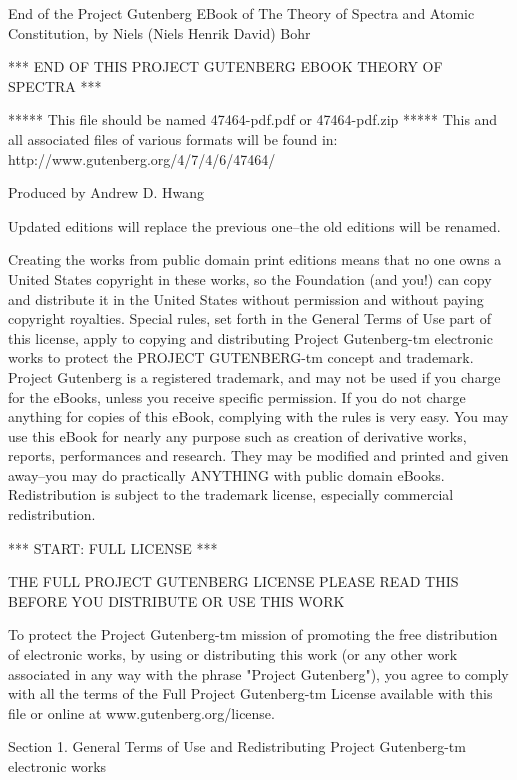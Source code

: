 \PGLicense
\begin{PGtext}
End of the Project Gutenberg EBook of The Theory of Spectra and Atomic
Constitution, by Niels (Niels Henrik David) Bohr

*** END OF THIS PROJECT GUTENBERG EBOOK THEORY OF SPECTRA ***

***** This file should be named 47464-pdf.pdf or 47464-pdf.zip *****
This and all associated files of various formats will be found in:
        http://www.gutenberg.org/4/7/4/6/47464/

Produced by Andrew D. Hwang

Updated editions will replace the previous one--the old editions
will be renamed.

Creating the works from public domain print editions means that no
one owns a United States copyright in these works, so the Foundation
(and you!) can copy and distribute it in the United States without
permission and without paying copyright royalties.  Special rules,
set forth in the General Terms of Use part of this license, apply to
copying and distributing Project Gutenberg-tm electronic works to
protect the PROJECT GUTENBERG-tm concept and trademark.  Project
Gutenberg is a registered trademark, and may not be used if you
charge for the eBooks, unless you receive specific permission.  If you
do not charge anything for copies of this eBook, complying with the
rules is very easy.  You may use this eBook for nearly any purpose
such as creation of derivative works, reports, performances and
research.  They may be modified and printed and given away--you may do
practically ANYTHING with public domain eBooks.  Redistribution is
subject to the trademark license, especially commercial
redistribution.



*** START: FULL LICENSE ***

THE FULL PROJECT GUTENBERG LICENSE
PLEASE READ THIS BEFORE YOU DISTRIBUTE OR USE THIS WORK

To protect the Project Gutenberg-tm mission of promoting the free
distribution of electronic works, by using or distributing this work
(or any other work associated in any way with the phrase "Project
Gutenberg"), you agree to comply with all the terms of the Full Project
Gutenberg-tm License available with this file or online at
  www.gutenberg.org/license.


Section 1.  General Terms of Use and Redistributing Project Gutenberg-tm
electronic works


\end{PGtext}
